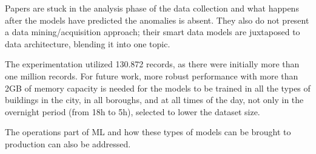 \documentclass[a4paper,12pt,twoside]{ThesisStyle}
\begin{document}
Papers are stuck in the analysis phase of the data collection and what happens after the models have predicted the anomalies is absent. They also do not present a data mining/acquisition approach; their smart data models are juxtaposed to data architecture, blending it into one topic.

The experimentation utilized 130.872 records, as there were initially more than one million records. For future work, more robust performance with more than 2GB of memory capacity is needed for the models to be trained in all the types of buildings in the city, in all boroughs, and at all times of the day, not only in the overnight period (from 18h to 5h), selected to lower the dataset size.

The operations part of ML and how these types of models can be brought to production can also be addressed.

\backmatter






\end{document}
